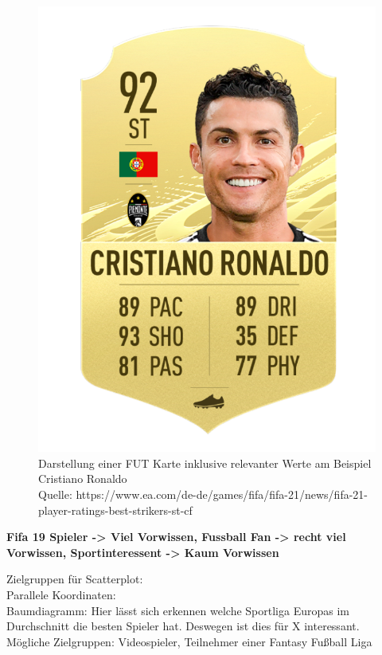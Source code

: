 \documentclass[usegeometry=true]{scrartcl}
\begin{document}
\begin{figure}
\centering
\includegraphics[scale=0.15]{grafiken/Ronaldo}
\caption{Darstellung einer FUT Karte inklusive relevanter Werte am Beispiel Cristiano Ronaldo\\ Quelle: https://www.ea.com/de-de/games/fifa/fifa-21/news/fifa-21-player-ratings-best-strikers-st-cf}
\label{Ronaldo}
\end{figure}



\textbf{Fifa 19 Spieler -> Viel Vorwissen, Fussball Fan -> recht viel Vorwissen, Sportinteressent -> Kaum Vorwissen}

Zielgruppen für Scatterplot:\\
Parallele Koordinaten:\\
Baumdiagramm: Hier lässt sich erkennen welche Sportliga Europas im Durchschnitt die besten Spieler hat. Deswegen ist dies für X interessant.\\
Mögliche Zielgruppen: Videospieler, Teilnehmer einer Fantasy Fußball Liga
\end{document}
